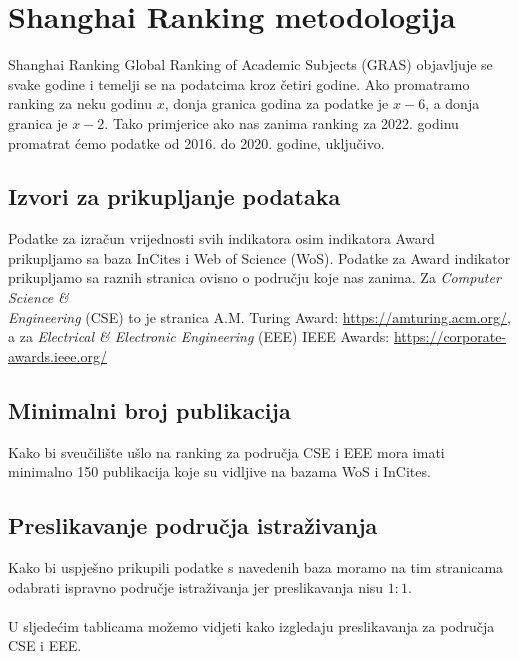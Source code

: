 \documentclass[times, utf8, zavrsni]{fer}
\begin{document}
\chapter{Shanghai Ranking metodologija}
Shanghai Ranking Global Ranking of Academic Subjects (GRAS) objavljuje se svake godine i temelji se na podatcima kroz četiri godine.
Ako  promatramo ranking za neku godinu $x$,
donja granica godina za podatke je $x-6$, a donja granica je $x-2$. Tako primjerice ako nas zanima ranking za 2022. godinu promatrat ćemo podatke od 2016. do 2020. godine, uključivo.

\section{Izvori za prikupljanje podataka}
Podatke za izračun vrijednosti svih indikatora osim indikatora Award prikupljamo sa baza InCites i Web of Science (WoS). 
Podatke za Award indikator prikupljamo sa raznih stranica ovisno o području koje nas zanima.
Za \emph{Computer Science \& \\Engineering} (CSE) to je stranica A.M. Turing Award: \url{https://amturing.acm.org/}, a za \emph{Electrical \& Electronic Engineering} (EEE) IEEE Awards:
\url{https://corporate-awards.ieee.org/}

\section{Minimalni broj publikacija} Kako bi sveučilište ušlo na ranking za područja CSE i EEE mora imati minimalno 150 publikacija koje su vidljive 
na bazama WoS i InCites.
\\ \section{Preslikavanje područja istraživanja}Kako bi uspješno prikupili podatke s navedenih baza moramo na tim stranicama odabrati ispravno područje istraživanja jer preslikavanja nisu $1:1$.
\\\\U sljedećim tablicama možemo vidjeti kako izgledaju preslikavanja za područja CSE i EEE.
\end{document}
